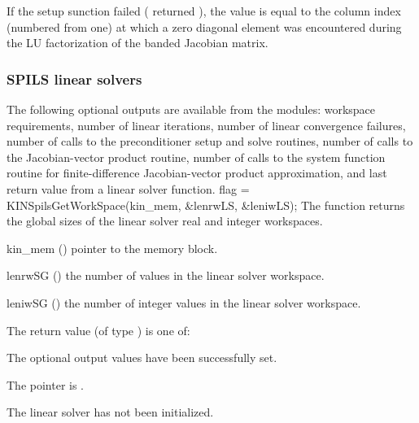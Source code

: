 {
  If the {\kinband} setup sunction failed ( returned ),
  the value  is equal to the column index (numbered from one) at which
  a zero diagonal element was encountered during the LU factorization of the 
  banded Jacobian matrix.
}

\subsubsection{SPILS linear solvers}\label{sss:optout_spils}
The following optional outputs are available from the {\kinspils}
modules: workspace requirements, number of linear iterations, number of
linear convergence failures, number of calls to the preconditioner
setup and solve routines, number of calls to the Jacobian-vector
product routine, number of calls to the system function routine for
finite-difference Jacobian-vector product approximation, and last
return value from a linear solver function.
{
  flag = KINSpilsGetWorkSpace(kin\_mem, \&lenrwLS, \&leniwLS);
}
{
  The function  returns the global sizes of the
  linear solver real and integer workspaces.
}
{
  \begin{args}
  \item[kin\_mem] ()
    pointer to the {\kinsol} memory block.
  \item[lenrwSG] ()
    the number of  values in the linear solver workspace.
  \item[leniwSG] ()
    the number of integer values in the linear solver workspace.
  \end{args}
}
{
  The return value  (of type ) is one of:
  \begin{args}
  \item[\Id{KINSPILS\_SUCCESS}] 
    The optional output values have been successfully set.
  \item[\Id{KINSPILS\_MEM\_NULL}]
    The  pointer is .
  \item[\Id{KINSPILS\_LMEM\_NULL}]
    The {\kinspgmr} linear solver has not been initialized.
  \end{args}
}
